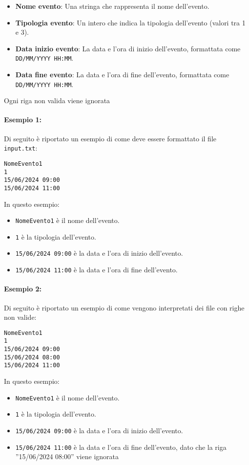\documentclass[11pt]{scrartcl} %
\begin{document}
\begin{itemize}
    \item \textbf{Nome evento}: Una stringa che rappresenta il nome dell'evento.
    \item \textbf{Tipologia evento}: Un intero che indica la tipologia dell'evento (valori tra 1 e 3).
    \item \textbf{Data inizio evento}: La data e l'ora di inizio dell'evento, formattata come \texttt{DD/MM/YYYY HH:MM}.
    \item \textbf{Data fine evento}: La data e l'ora di fine dell'evento, formattata come \texttt{DD/MM/YYYY HH:MM}.
\end{itemize}

Ogni riga non valida viene ignorata

\paragraph{Esempio 1:}
Di seguito è riportato un esempio di come deve essere formattato il file \texttt{input.txt}:

\begin{verbatim}
NomeEvento1
1
15/06/2024 09:00
15/06/2024 11:00
\end{verbatim}

In questo esempio:
\begin{itemize}
    \item \texttt{NomeEvento1} è il nome dell'evento.
    \item \texttt{1} è la tipologia dell'evento.
    \item \texttt{15/06/2024 09:00} è la data e l'ora di inizio dell'evento.
    \item \texttt{15/06/2024 11:00} è la data e l'ora di fine dell'evento.
\end{itemize}

\paragraph{Esempio 2:}

Di seguito è riportato un esempio di come vengono interpretati dei file con righe non valide:

\begin{verbatim}
NomeEvento1
1
15/06/2024 09:00
15/06/2024 08:00
15/06/2024 11:00
\end{verbatim}

In questo esempio:
\begin{itemize}
    \item \texttt{NomeEvento1} è il nome dell'evento.
    \item \texttt{1} è la tipologia dell'evento.
    \item \texttt{15/06/2024 09:00} è la data e l'ora di inizio dell'evento.
    \item \texttt{15/06/2024 11:00} è la data e l'ora di fine dell'evento, dato che la riga ''15/06/2024 08:00'' viene ignorata
\end{itemize}
\end{document}
